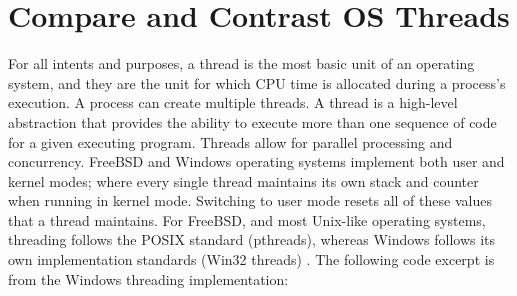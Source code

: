 \documentclass[letterpaper,10pt,draftclsnofoot,onecolumn]{IEEEtran}
\begin{document}
\section{Compare and Contrast OS Threads}
For all intents and purposes, a thread is the most basic unit of an operating system, and they are the unit for which CPU time is allocated during a process’s execution. A process can create multiple threads. A thread is a high-level abstraction that provides the ability to execute more than one sequence of code for a given executing program. Threads allow for parallel processing and concurrency. FreeBSD and Windows operating systems implement both user and kernel modes; where every single thread maintains its own stack and counter when running in kernel mode. Switching to user mode resets all of these values that a thread maintains. For FreeBSD, and most Unix-like operating systems, threading follows the POSIX standard (pthreads), whereas Windows follows its own implementation standards (Win32 threads) \cite{MSWindows1} \cite{FreeBSD2}. The following code excerpt is from the Windows threading implementation: \cite{PsCreateSystemThread} \cite{MSWindows3} \\





\end{document}
